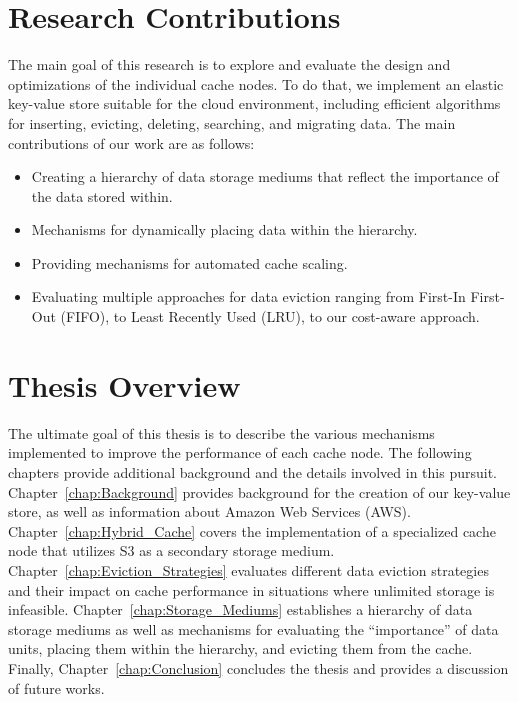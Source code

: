 \section{Research Contributions} %
\label{sec:Research_Contributions}
The main goal of this research is to explore and evaluate the design and
optimizations of the individual cache nodes. To do that, we implement an
elastic key-value store suitable for the cloud environment, including efficient
algorithms for inserting, evicting, deleting, searching, and migrating data.
The main contributions of our work are as follows:
\begin{itemize}
  \item Creating a hierarchy of data storage mediums that reflect the
    importance of the data stored within.
  \item Mechanisms for dynamically placing data within the hierarchy.
  \item Providing mechanisms for automated cache scaling.
  \item Evaluating multiple approaches for data eviction ranging from First-In
    First-Out (FIFO), to Least Recently Used (LRU), to our cost-aware approach.
\end{itemize}


\section{Thesis Overview} %
\label{sec:Thesis_Overview}
The ultimate goal of this thesis is to describe the various mechanisms
implemented to improve the performance of each cache node. The following
chapters provide additional background and the details involved in this
pursuit. Chapter~\ref{chap:Background} provides background for the creation of
our key-value store, as well as information about Amazon Web Services (AWS).
Chapter~\ref{chap:Hybrid_Cache} covers the implementation of a specialized
cache node that utilizes S3 as a secondary storage medium.
Chapter~\ref{chap:Eviction_Strategies} evaluates different data eviction
strategies and their impact on cache performance in situations where unlimited
storage is infeasible. Chapter~\ref{chap:Storage_Mediums} establishes a
hierarchy of data storage mediums as well as mechanisms for evaluating the
``importance'' of data units, placing them within the hierarchy, and evicting
them from the cache. Finally, Chapter~\ref{chap:Conclusion} concludes the
thesis and provides a discussion of future works.

